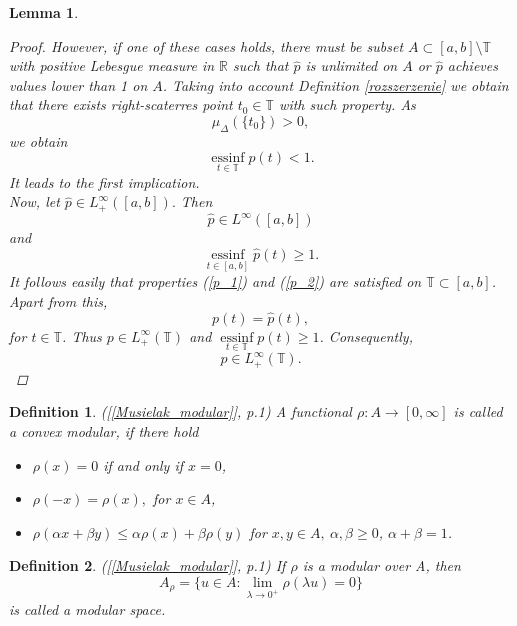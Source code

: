 \documentclass[12pt,a4paper,oneside,titlepage]{article}
\newtheorem{Def}{Definition}
\newtheorem{Lemat}{Lemma}
\newcommand{\essinf}{\operatorname{essinf}\limits}
\begin{document}
\begin{Lemat}
\begin{proof}
However, if one of these cases holds, there must be subset $A \subset [a,b] \setminus \mathbb{T}$ with positive Lebesgue measure in $\mathbb{R}$ such that  $\widehat{p}$ is unlimited on $A$ or $\widehat{p} $ achieves values lower than 1 on $A$. Taking into account Definition \ref{rozszerzenie} we obtain that there exists right-scaterres point $t_0 \in \mathbb{T}$ with such property. As 
\begin{equation}
\nonumber
\mu_{\Delta}(\lbrace t_0 \rbrace) >0,
\end{equation}
we obtain 
\begin{equation}
\nonumber
\essinf_{t \in \mathbb{T}} p(t) <1 .
\end{equation}
It leads to the first implication. \\
\indent
Now, let $\widehat{p} \in L^{\infty}_{+}([a,b]).$ Then
\begin{equation}
\label{p_1}
\widehat{p} \in L^{\infty}([a,b])
\end{equation}
and
\begin{equation}
\label{p_2}
\essinf_{t \in [a,b]} \widehat{p}(t) \geq 1.
\end{equation}
It follows easily that properties (\ref{p_1}) and (\ref{p_2}) are satisfied on $\mathbb{T} \subset [a,b]$. Apart from this, 
\begin{equation}
\nonumber
p(t)=\widehat{p}(t),
\end{equation} 
for $t \in{\mathbb{T}}$. Thus $p\in L^{\infty}_{+}(\mathbb{T})$ and $\essinf_{t \in \mathbb{T}}p(t)\geq 1$. Consequently,
\begin{equation}
\nonumber
p \in L^{\infty}_{+}(\mathbb{T}).
\end{equation}
\end{proof}
\end{Lemat}

\smallskip



\begin{Def} ([\ref{Musielak_modular}], p.1) \label{definicjaModularu}
A functional $\rho : A \rightarrow [0, \infty]$ is called a convex modular, if there hold
\begin{itemize}
\item[($\rho$1)] $\rho(x) = 0$ if and only if $x=0$,
\item[($\rho$2)] $\rho(-x) = \rho(x),$ for $x \in A$,
\item[($\rho$3)] $\rho(\alpha x + \beta y) \leq \alpha \rho(x)+\beta \rho(y)$ for $ x,y \in A,~  \alpha, \beta \geq 0$, $\alpha + \beta = 1$. 
\end{itemize}
\end{Def}
\begin{Def} ([\ref{Musielak_modular}], p.1)
If $\rho$ is a modular over A, then
\begin{equation}
A_{\rho} = \lbrace u \in A: \lim_{\lambda \rightarrow 0^{+}} \rho(\lambda u)=0 \rbrace
\end{equation}
is called a modular space.
\end{Def}
\end{document}
